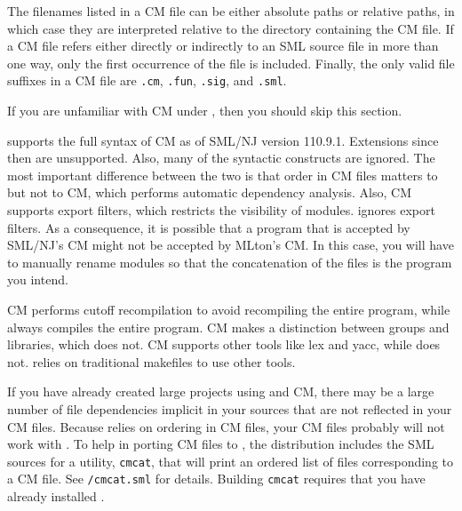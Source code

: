 The filenames listed in a CM file can be either absolute paths or relative
paths, in which case they are interpreted relative to the directory containing
the CM file.  If a CM file refers either directly or indirectly to an SML source
file in more than one way, only the first occurrence of the file is included.
Finally, the only valid file suffixes in a CM file are {\tt .cm}, {\tt .fun},
{\tt .sig}, and {\tt .sml}.


If you are unfamiliar with CM under {\smlnj}, then you should skip this
section.

{\mlton} supports the full syntax of CM as of SML/NJ version 110.9.1.
Extensions since then are unsupported.  Also, many of the syntactic
constructs are ignored.  The most important difference between the two is that
order in CM files matters to {\mlton} but not to CM, which performs automatic
dependency analysis.  Also, CM supports export filters, which restricts the
visibility of modules.  {\mlton} ignores export filters.  As a consequence, it
is possible that a program that is accepted by SML/NJ's CM might not be accepted
by MLton's CM.  In this case, you will have to manually rename modules so that
the concatenation of the files is the program you intend.

CM performs cutoff recompilation to avoid recompiling the entire program, while
{\mlton} always compiles the entire program.  CM makes a distinction between
groups and libraries, which {\mlton} does not.  CM supports other tools like lex
and yacc, while {\mlton} does not.  {\mlton} relies on traditional makefiles to
use other tools.


If you have already created large projects using {\smlnj} and CM, there may be a
large number of file dependencies implicit in your sources that are not
reflected in your CM files.  Because {\mlton} relies on ordering in CM files,
your CM files probably will not work with {\mlton}.  To help in porting CM files
to {\mlton}, the {\mlton} distribution includes the SML sources for a
utility, {\tt cmcat}, that will print an ordered list of files corresponding to
a CM file.  See {\tt \doc/cmcat.sml} for details.  Building {\tt cmcat}
requires that you have already installed {\smlnj}.
